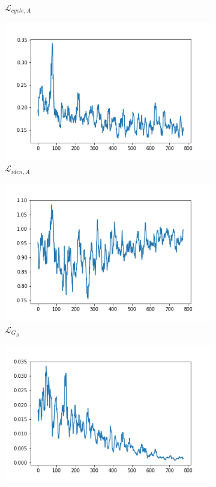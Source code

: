 \documentclass[twocolumn,11pt]{ctexart}
\begin{document}
\begin{figure}[htb]
\begin{subfigure}[b]{0.23\linewidth}
        \caption{$\mathcal{L}_{cycle,A}$}
      \end{subfigure}
      \begin{subfigure}[b]{0.23\linewidth}
        \includegraphics[width=\linewidth]{exp3_idt_A.png}
        \caption{$\mathcal{L}_{iden,A}$}
      \end{subfigure}
      \begin{subfigure}[b]{0.23\linewidth}
        \includegraphics[width=\linewidth]{exp3_G_B.png}
        \caption{$\mathcal{L}_{G_B}$}
      \end{subfigure}
      \begin{subfigure}[b]{0.23\linewidth}
        \includegraphics[width=\linewidth]{exp3_D_B.png}

\end{subfigure}
\end{figure}
\end{document}

